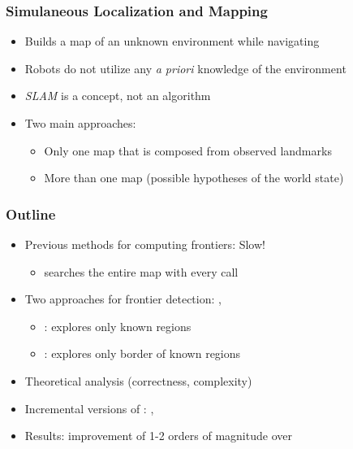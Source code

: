 \begin{frame}
\frametitle{Simulaneous Localization and Mapping}
\begin{itemize}
  \item Builds a map of an unknown environment while navigating
  \item Robots do not utilize any \emph{a priori} knowledge of the environment
  \item \emph{SLAM} is a concept, not an algorithm \pause
  \item Two main approaches:
  \begin{itemize}
	      \item Only one map that is composed from observed landmarks   
		  \item More than one map (possible hypotheses of the world state)
  \end{itemize}
\end{itemize}
\end{frame}




\begin{frame}
\frametitle{Outline}
	\begin{itemize}    	    	
	 \item Previous methods for computing frontiers: Slow!
		\begin{itemize}
		 \item searches the entire map with every call
		\end{itemize}
	 \item Two approaches for frontier detection: \WFD, \FFD
	 	\begin{itemize}
		 	\item \WFD: explores only known regions
		 	\item \FFD: explores only border of known regions
		\end{itemize}
	 \item Theoretical analysis (correctness, complexity)
	 \item Incremental versions of \WFD: \WFDINC, \WFDIP
	 \item Results: improvement of 1-2 orders of magnitude over \SOTA
	\end{itemize}
\end{frame}

